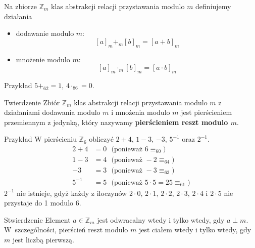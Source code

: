 \documentclass[a4paper,10pt]{beamer}
\begin{document}
\begin{frame}
	
	Na zbiorze $\mathbb{Z}_m$ klas abstrakcji relacji przystawania modulo $m$ definiujemy działania
	\begin{itemize}
		\item dodawanie modulo $m$:
		$$[a]_m +_m[b]_m=[a+b]_m$$
		\item mnożenie modulo $m$:
		$$[a]_m \cdot_m[b]_m=[a\cdot b]_m$$
	\end{itemize}

	\begin{exampleblock}{Przykład}
		$5+_62=1$, $4\cdot_86=0$.
	\end{exampleblock}
	
	\begin{block}{Twierdzenie}
		Zbiór $\mathbb{Z}_m$ klas abstrakcji relacji przystawania modulo $m$ z działaniami dodawania modulo $m$ i mnożenia modulo $m$ jest pierścieniem przemiennym z jedynką, który nazywamy {\bf pierścieniem reszt modulo $m$}.
	\end{block}
	
\end{frame}



\begin{frame}
	
	\begin{exampleblock}{Przykład}
		W pierścieniu $\mathbb{Z}_6$ obliczyć $2+4$, $1-3$, $-3$, $5^{-1}$ oraz $2^{-1}$.
		\begin{align*}
			2+4&=0\ \ \ \mbox{(ponieważ }6\equiv_60\mbox{)}\\
			1-3&=4\ \ \ \mbox{(ponieważ }-2\equiv_64\mbox{)}\\
			-3&=3\ \ \ \mbox{(ponieważ }-3\equiv_63\mbox{)}\\
			5^{-1}&=5\ \ \ \mbox{(ponieważ }5\cdot5=25\equiv_61\mbox{)}
		\end{align*}
	$2^{-1}$ nie istnieje, gdyż każdy z iloczynów $2\cdot0,\,2\cdot1,\,2\cdot2,\,2\cdot3,\,2\cdot4$ i $2\cdot5$ nie przystaje do 1 modulo 6.
	\end{exampleblock}

	\begin{block}{Stwierdzenie}
		Element $a\in\mathbb{Z}_m$ jest odwracalny wtedy i tylko wtedy, gdy $a\perp m$. W~szczególności, pierścień reszt modulo $m$ jest ciałem wtedy i tylko wtedy, gdy $m$ jest liczbą pierwszą.
	\end{block}
	
\end{frame}
\end{document}
